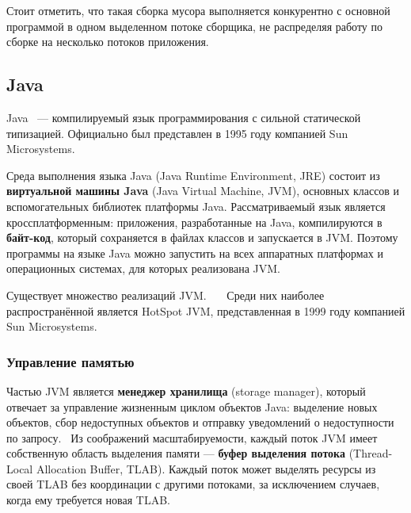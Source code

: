 Стоит отметить, что такая сборка мусора выполняется конкурентно с основной программой в одном выделенном потоке сборщика, не распределяя работу по сборке на несколько потоков приложения.~\cite{python_threaded_gc}


\subsection{Java}

Java~\cite{java_gc_basics} --- компилируемый язык программирования с сильной статической типизацией. Официально был представлен в 1995 году компанией Sun Microsystems. 

Среда выполнения языка Java (Java Runtime Environment, JRE) состоит из \textbf{виртуальной машины Java} (Java Virtual Machine, JVM), основных классов и вспомогательных библиотек платформы Java. Рассматриваемый язык является кроссплатформенным: приложения, разработанные на Java, компилируются в \textbf{байт-код}, который сохраняется в файлах классов и запускается в JVM. Поэтому программы на языке Java можно запустить на всех аппаратных платформах и операционных системах, для которых реализована JVM.~\cite{java_gc_basics}

Существует множество реализаций JVM.~\cite{java_j9}~\cite{java_codename_one}~\cite{java_graalvm}
Среди них наиболее распространённой является HotSpot JVM, представленная в 1999 году компанией Sun Microsystems.~\cite{java_hotspot} %



\subsubsection{Управление памятью}
\label{generations}

Частью JVM является \textbf{менеджер хранилища} (storage manager), который отвечает за управление жизненным циклом объектов Java: выделение новых объектов, сбор недоступных объектов и отправку уведомлений о недоступности по запросу.~\cite{java_storage_management} Из соображений масштабируемости, каждый поток JVM имеет собственную область выделения памяти --- \textbf{буфер выделения потока} (Thread-Local Allocation Buffer, TLAB). Каждый поток может выделять ресурсы из своей TLAB без координации с другими потоками, за исключением случаев, когда ему требуется новая TLAB.~\cite{java_storage_management}

